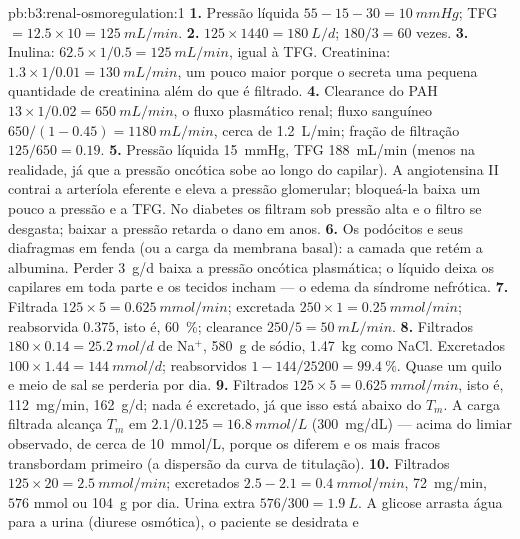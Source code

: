\begin{solution}{pb:b3:renal-osmoregulation:1}
\textbf{1.} Pressão líquida $55 - 15 - 30 = \qty{10}{mmHg}$; TFG $= 12.5
\times 10 = \qty{125}{mL/min}$.
\textbf{2.} $125\times 1440 = \qty{180}{L/d}$; $180/3 = 60$ vezes.
\textbf{3.} Inulina: $62.5\times 1/0.5 = \qty{125}{mL/min}$, igual à
TFG. Creatinina: $1.3\times 1/0.01 = \qty{130}{mL/min}$, um pouco maior
porque o  secreta uma pequena quantidade de creatinina
além do que é filtrado.
\textbf{4.} Clearance do PAH $13\times 1/0.02 = \qty{650}{mL/min}$, o
fluxo plasmático renal; fluxo sanguíneo $650/(1 - 0.45) = \qty{1180}{mL/min}$, cerca de \qty{1.2}{L/min}; fração de filtração
$125/650 = 0.19$.
\textbf{5.} Pressão líquida \qty{15}{mmHg}, TFG \qty{188}{mL/min} (menos
na realidade, já que a pressão oncótica sobe ao longo do capilar). A
angiotensina II contrai a arteríola eferente e eleva a pressão
glomerular; bloqueá-la baixa um pouco a pressão e a TFG. No diabetes os
 filtram sob pressão alta e o filtro se desgasta; baixar a
pressão retarda o dano em anos.
\textbf{6.} Os podócitos e seus diafragmas em fenda (ou a carga da
membrana basal): a camada que retém a albumina. Perder \qty{3}{g/d}
baixa a pressão oncótica plasmática; o líquido deixa os capilares em
toda parte e os tecidos incham --- o edema da síndrome nefrótica.
\textbf{7.} Filtrada $125\times 5 = \qty{0.625}{mmol/min}$; excretada
$250\times 1 = \qty{0.25}{mmol/min}$; reabsorvida $0.375$, isto é,
\qty{60}{\%}; clearance $250/5 = \qty{50}{mL/min}$.
\textbf{8.} Filtrados $180\times 0.14 = \qty{25.2}{mol/d}$ de
Na$^{+}$, \qty{580}{g} de sódio, \qty{1.47}{kg} como NaCl. Excretados
$100\times 1.44
= \qty{144}{mmol/d}$; reabsorvidos $1 - 144/\num{25200} = \qty{99.4}{\%}$. Quase um quilo e meio de sal se
perderia por dia.
\textbf{9.} Filtrados $125\times 5 = \qty{0.625}{mmol/min}$, isto é,
\qty{112}{mg/min}, \qty{162}{g/d}; nada é excretado, já que isso está
abaixo do $T_{m}$. A carga filtrada alcança $T_{m}$ em $2.1/0.125 =
\qty{16.8}{mmol/L}$ (\qty{300}{mg/dL}) --- acima do limiar observado, de
cerca de \qty{10}{mmol/L}, porque os  diferem e os mais fracos
transbordam primeiro (a dispersão da curva de titulação).
\textbf{10.} Filtrados $125\times 20 = \qty{2.5}{mmol/min}$; excretados
$2.5 - 2.1 = \qty{0.4}{mmol/min}$, \qty{72}{mg/min}, $576$ mmol ou
\qty{104}{g} por dia. Urina extra $576/300 = \qty{1.9}{L}$. A glicose
arrasta água para a urina (diurese osmótica), o paciente se desidrata e

\end{solution}
